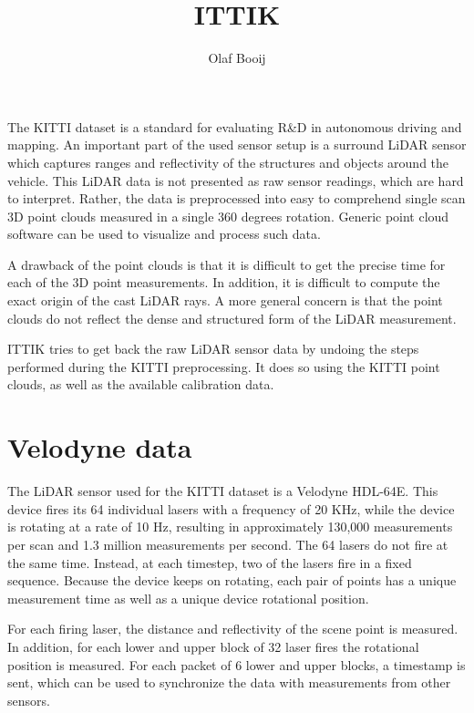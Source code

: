 \documentclass[english]{article}
\begin{document}
\title{ITTIK}
\author{Olaf Booij}

\maketitle

The KITTI dataset is a standard for evaluating R\&D in autonomous
driving and mapping. An important part of the used sensor setup is a
surround LiDAR sensor which captures ranges and reflectivity of the
structures and objects around the vehicle.
This LiDAR data is not presented as raw sensor readings, which are hard
to interpret. Rather, the data is preprocessed into easy to comprehend
single scan 3D point clouds measured in a single 360 degrees rotation.
Generic point cloud software can be used to visualize and process such
data.

A drawback of the point clouds is that it is difficult to get the
precise time for each of the 3D point measurements. In addition, it is
difficult to compute the exact origin of the cast LiDAR rays. A more
general concern is that the point clouds do not reflect the dense and
structured form of the LiDAR measurement.

ITTIK tries to get back the raw LiDAR sensor data by undoing the steps
performed during the KITTI preprocessing. It does so using the KITTI
point clouds, as well as the available calibration data.

\section{Velodyne data}
The LiDAR sensor used for the KITTI dataset is a Velodyne HDL-64E. This
device fires its 64 individual lasers with a frequency of 20 KHz, while
the device is rotating at a rate of 10 Hz, resulting in approximately
130,000 measurements per scan and 1.3 million measurements per
second. The 64 lasers do not fire at the same time. Instead, at each
timestep, two of the lasers fire in a fixed sequence. Because the device
keeps on rotating, each pair of points has a unique measurement time as
well as a unique device rotational position.

For each firing laser, the distance and reflectivity of the scene point
is measured. In addition, for each lower and upper block of 32 laser
fires the rotational position is measured. For each packet of 6 lower
and upper blocks, a timestamp is sent, which can be used to
synchronize the data with measurements from other sensors.
\end{document}
